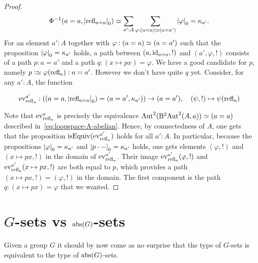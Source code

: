 \begin{proof}
\begin{displaymath}
    \inv\Phi(a=a,\settrunc{\refl {a=a}}) \simeq \sum_{a':A}
    \sum_{\varphi : (a=a) \weq (a=a')}\settrunc{\varphi} = \kappa_{a'}.
  \end{displaymath}
  For an element $a':A$ together with $\varphi: (a=a) \simeq (a=a')$
  such that the proposition ${\lvert\varphi\rvert}_0 = \kappa_{a'}$ holds, a
  path between $(a,\mathord{\mathrm{id}}_{a=a},!)$ and $(a',\varphi,!)$ consists of a
  path $p:a=a'$ and a path $q:(x\mapsto p x) = \varphi$. We have a
  good candidate for $p$, namely $p\defequi \varphi(\refl
  a):a=a'$. However we don't have quite $q$ yet. Consider, for any
  $a':A$, the function
  \begin{fullwidth}
    \begin{displaymath}
      \ev_{\refl a}^{a'} :
      \left(
        (a=a, \settrunc{\refl{a=a}} ) =
        (a=a', \kappa_{a'} )
      \right)
      \to (a=a'),\quad (\psi,!) \mapsto \psi(\refl a) 
    \end{displaymath}
  \end{fullwidth}
  Note that $\ev_{\refl a}^{a}$ is precisely the equivalence
  $\mathrm{Aut}^2_{}{(\mathrm{B}^2\mathrm{Aut}^2_{}(A,a))}\simeq (a=a)$ described
  in~\cref{eq:loopspace-A-abelian}. Hence, by connectedness of $A$,
  one gets that the proposition $\isEq(\ev_{\refl a}^{a'})$ holds for
  all $a':A$. In particular, because the propositions
  ${\lvert\varphi\rvert}_0 = \kappa_{a'}$ and
  ${\lvert p\cdot{-}\rvert}_0 = \kappa_{a'}$ holds, one gets elements
  $(\varphi,!)$ and $(x\mapsto px,!)$ in the domain of
  $\ev_{\refl a}^{a'}$. Their image $\ev_{\refl a}^{a'}(\varphi,!)$
  and $\ev_{\refl a}^{a'}(x\mapsto px,!)$ are both equal to $p$, which
  provides a path $(x\mapsto px,!)=(\varphi,!)$ in the domain. The
  first component is the path $q:(x\mapsto px) = \varphi$ that we
  wanted.
\end{proof}


\section{$G$-sets vs $\mathrm{abs}(G)$-sets}
\label{sec:Gsetsabstrconcr}

Given a group $G$ it should by now come as no surprise that the type of $G$-sets is equivalent to the type of $\mathrm{abs}(G)$-sets.

